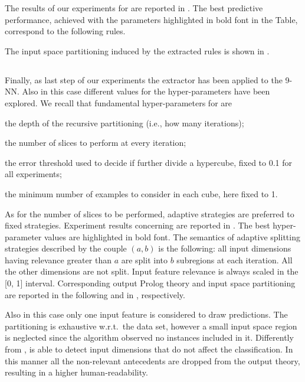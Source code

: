 \documentclass[
]{ceurart}
\begin{document}
The results of our experiments for \iter{} are reported in .
%
The best predictive performance, achieved with the parameters highlighted in bold font in the Table, correspond to the following rules.
%

%
The input space partitioning induced by the extracted rules is shown in .

\subsection{\gridex{}}



Finally, as last step of our experiments the \gridex{} extractor has been applied to the 9-NN.
%
Also in this case different values for the hyper-parameters have been explored.
%
We recall that fundamental hyper-parameters for \gridex{} are
%
\begin{inlinelist}
	\item the depth of the recursive partitioning (i.e., how many iterations);
	\item the number of slices to perform at every iteration;
	\item the error threshold used to decide if further divide a hypercube, fixed to 0.1 for all experiments;
	\item the minimum number of examples to consider in each cube, here fixed to 1.
\end{inlinelist}
%
As for the number of slices to be performed, adaptive strategies are preferred to fixed strategies.
%
Experiment results concerning \gridex{} are reported in .
%
The best hyper-parameter values are highlighted in bold font.
%
The semantics of adaptive splitting strategies described by the couple $(a, b)$ is the following: all input dimensions having relevance greater than $a$ are split into $b$ subregions at each iteration.
%
All the other dimensions are not split.
%
Input feature relevance is always scaled in the [0, 1] interval.
%
Corresponding output Prolog theory and input space partitioning are reported in the following and in , respectively.



Also in this case only one input feature is considered to draw predictions.
%
The partitioning is exhaustive w.r.t.\ the data set, however a small input space region is neglected since the algorithm observed no instances included in it.
%
Differently from \iter{}, \gridex{} is able to detect input dimensions that do not affect the classification.
%
In this manner all the non-relevant antecedents are dropped from the output theory, resulting in a higher human-readability.
\end{document}
